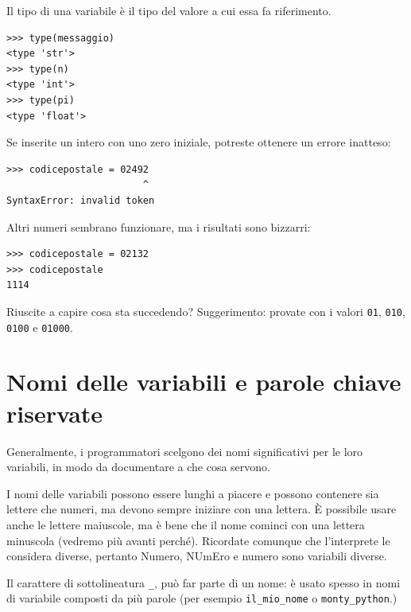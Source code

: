 \documentclass[10pt]{book}
\begin{document}
Il tipo di una variabile è il tipo del valore a cui essa fa riferimento.

\begin{verbatim}
>>> type(messaggio)
<type 'str'>
>>> type(n)
<type 'int'>
>>> type(pi)
<type 'float'>
\end{verbatim}

\vspace{0.2in}
\begin{exercise}

Se inserite un intero con uno zero iniziale, potreste ottenere un errore inatteso:

\begin{verbatim}
>>> codicepostale = 02492
                        ^
SyntaxError: invalid token
\end{verbatim}

Altri numeri sembrano funzionare, ma i risultati sono bizzarri:

\begin{verbatim}
>>> codicepostale = 02132
>>> codicepostale
1114
\end{verbatim}

Riuscite a capire cosa sta succedendo? Suggerimento: provate con i valori
 {\tt 01}, {\tt 010}, {\tt 0100} e {\tt 01000}.

\end{exercise}



\section{Nomi delle variabili e parole chiave riservate}

Generalmente, i programmatori scelgono dei nomi significativi per le loro variabili, in modo da documentare a che cosa servono.

I nomi delle variabili possono essere lunghi a piacere e possono contenere sia lettere che numeri, ma devono sempre iniziare con una lettera. È possibile usare anche le lettere maiuscole, ma è bene che il nome cominci con una lettera minuscola (vedremo più avanti perché). Ricordate comunque che l'interprete le considera diverse, pertanto Numero, NUmEro e numero sono variabili diverse.

Il carattere di sottolineatura \verb"_", può far parte di un nome: è usato spesso in nomi di variabile composti da più parole (per esempio 
\verb"il_mio_nome" o \verb"monty_python".)
\end{document}
